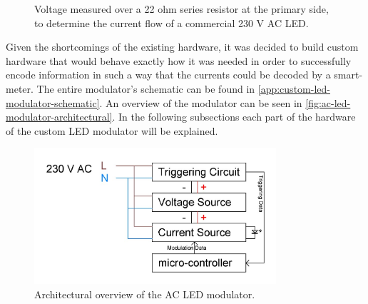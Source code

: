 \begin{figure}[tb]
	\centering     %

	\caption{Voltage measured over a 22 ohm series resistor at the primary side, to determine the current flow of a commercial 230 V AC LED.}
\end{figure}





Given the shortcomings of the existing hardware, it was decided to build custom hardware that would behave exactly how it was needed in order to successfully encode information in such a way that the currents could be decoded by a smart-meter.
The entire modulator's schematic can be found in \autoref{app:custom-led-modulator-schematic}.
An overview of the modulator can be seen in \autoref{fig:ac-led-modulator-architectural}.
In the following subsections each part of the hardware of the custom LED modulator will be explained.


\begin{figure}[htb]
	\centering
	\includegraphics[angle=0,width=0.8\textwidth]{chapters/hardware-chapters/ac-modulator-architectural.JPG}
	\caption{Architectural overview of the AC LED modulator.}
	\label{fig:ac-led-modulator-architectural}
\end{figure}



